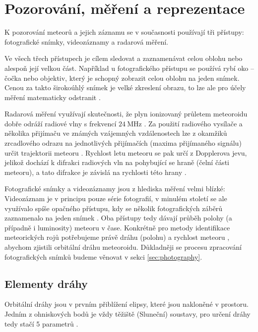 \chapter{Pozorování, měření a reprezentace}%
K pozorování meteorů a jejich záznamu se v současnosti používají tři přístupy: fotografické snímky, videozáznamy a radarová měření.

Ve všech třech přístupech je cílem sledovat a zaznamenávat celou oblohu nebo alespoň její velkou část. Například u fotografického přístupu se používá rybí oko \cite{ceplecha} -- čočka nebo objektiv, který je schopný zobrazit celou oblohu na jeden snímek. Cenou za takto širokoúhlý snímek je velké zkreslení obrazu, to lze ale pro účely měření matematicky odstranit \cite{ceplecha}.

\smallskip

Radarová měření využívají skutečnosti, že plyn ionizovaný průletem meteoroidu dobře odráží radiové vlny s frekvencí $24\:\text{MHz}$  \cite{radiosurvey}. Za použití radiového vysílače a několika přijímaču ve známých vzájemných vzdálenostech lze z okamžiků zrcadlového odrazu na jednotlivých přijímačích (maxima přijímaného signálu) určit trajektorii meteoru \cite{radiosurvey}. Rychlost letu meteoru se pak určí z Dopplerova jevu, jelikož dochází k difrakci radiových vln na pohybující se hraně (čelní části meteoru), a tato difrakce je závislá na rychlosti této hrany \cite{radiosurvey}.

\smallskip

Fotografické snímky a videozáznamy jsou z hlediska měření velmi blízké: Videozáznam je v principu pouze série fotografií, v minulém století se ale využívalo spíše opačného přístupu, kdy se několik fotografických záběrů zaznamenalo na jeden snímek \cite{ceplecha}. Oba přístupy tedy dávají průběh polohy (a případně i luminosity) meteoru v čase. Konkrétně pro metody identifikace meteorických rojů potřebujeme právě dráhu (polohu) a rychlost meteoru \cite{ceplecha}, abychom zjistili orbitální dráhu meteoroidu. Důkladněji se procesu zpracování fotografických snímků budeme věnovat v sekci \ref{sec:photography}. 

\section{Elementy dráhy}\label{sec:orbit}%
Orbitální dráhy jsou v prvním přiblížení elipsy, které jsou nakloněné v prostoru. Jedním z ohniskových bodů je vždy těžiště (Sluneční) soustavy, pro určení dráhy tedy stačí 5 parametrů \cite{astro}.

